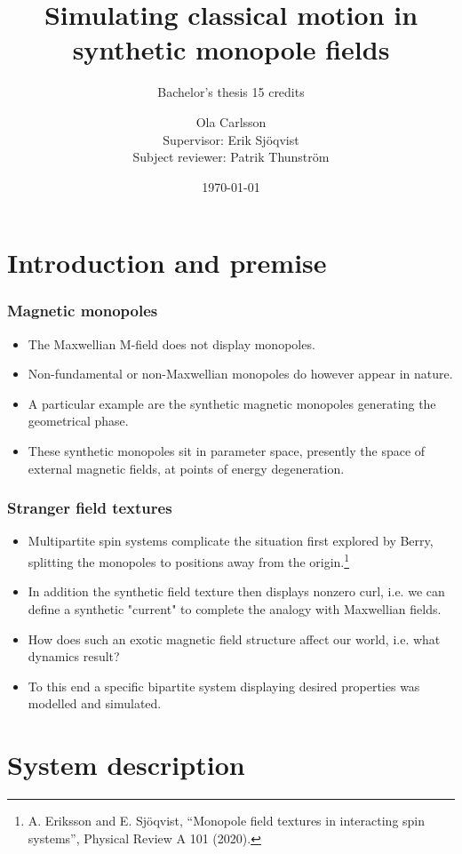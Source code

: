 \documentclass[aspectratio=169]{beamer}
\author[Ola Carlsson]{Ola Carlsson \\ Supervisor: Erik
Sjöqvist \\ Subject reviewer: Patrik Thunström}
\title{Simulating classical motion in synthetic monopole fields}
\subtitle{Bachelor's thesis  15 credits}
\date[\today]{\today}
\institute[Department for Physics and Astronomy]{Department for Physics and Astronomy, division of Materials Theory}
\begin{document}
\begin{frame}[plain]
  \titlepage
\end{frame}
\section{Introduction and premise}
\begin{frame}
  \frametitle{Magnetic monopoles}
  \begin{itemize}
          \item The Maxwellian M-field does not display
                  monopoles.
          \item Non-fundamental or non-Maxwellian monopoles do however appear in nature.
          \item A particular example are the synthetic magnetic monopoles generating the
                  geometrical phase.
          \item These synthetic monopoles sit in parameter space, presently the space of
                  external magnetic fields, at points of energy
                  degeneration.
  \end{itemize}
\end{frame}
\begin{frame}
    \frametitle{Stranger field textures}
        \begin{itemize}
                \item Multipartite spin systems complicate the situation first explored by
                        Berry, splitting the monopoles to positions away from the
                        origin.\footnote{A. Eriksson and E. Sjöqvist, “Monopole field textures in interacting spin systems”, Physical Review A
101 (2020).}
            \item In addition the synthetic field texture then displays nonzero curl, i.e.
                    we can define a synthetic "current" to complete the analogy with
                    Maxwellian fields.
            \item How does such an exotic magnetic field structure affect our world, i.e.
                    what dynamics result?
            \item To this end a specific bipartite system displaying desired properties was modelled
                    and simulated.
        \end{itemize}
\end{frame}
\section{System description}
\end{document}

